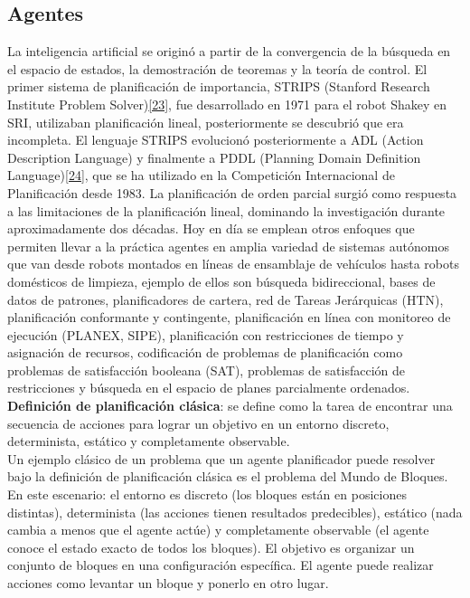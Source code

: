     \subsection*{ \Large Agentes}

    La inteligencia artificial se originó a partir de la convergencia de la búsqueda en el espacio de estados, la demostración de teoremas y la teoría de control.
        El primer sistema de planificación de importancia, STRIPS (Stanford Research Institute Problem Solver)\hyperref[sec:33]{[23]}, fue desarrollado en 1971 para el robot Shakey en SRI,
        utilizaban planificación lineal, posteriormente se descubrió que era incompleta. El lenguaje STRIPS evolucionó posteriormente a ADL (Action Description
        Language) y finalmente a PDDL (Planning Domain Definition Language)\hyperref[sec:34]{[24]}, que se ha utilizado en la Competición Internacional de Planificación desde 1983.
        La planificación de orden parcial surgió como respuesta a las limitaciones de la planificación lineal, dominando la investigación durante aproximadamente dos
        décadas. Hoy en día se emplean otros enfoques que permiten llevar a la práctica agentes en amplia variedad de sistemas autónomos que van desde robots montados
        en líneas de ensamblaje de vehículos hasta robots domésticos de limpieza, ejemplo de ellos son búsqueda bidireccional, bases de datos de patrones,
        planificadores de cartera, red de Tareas Jerárquicas (HTN), planificación conformante y contingente, planificación en línea con monitoreo de ejecución
        (PLANEX, SIPE), planificación con restricciones de tiempo y asignación de recursos, codificación de problemas de planificación
        como problemas de satisfacción booleana (SAT), problemas de satisfacción de restricciones y búsqueda en el espacio de planes parcialmente ordenados. \\


        \textbf{Definición de planificación clásica}: se define como la tarea de encontrar una secuencia de acciones para lograr un objetivo en un entorno discreto, determinista, estático y completamente observable. \\

        Un ejemplo clásico de un problema que un agente planificador puede resolver bajo la definición de planificación clásica es el problema del Mundo de Bloques. En este escenario: el entorno es discreto (los bloques están en posiciones distintas), determinista (las acciones tienen resultados predecibles), estático (nada cambia a menos que el agente actúe) y completamente observable (el agente conoce el estado exacto de todos los bloques). El objetivo es organizar un conjunto de bloques en una configuración específica. El agente puede realizar acciones como levantar un bloque y ponerlo en otro lugar.\\

